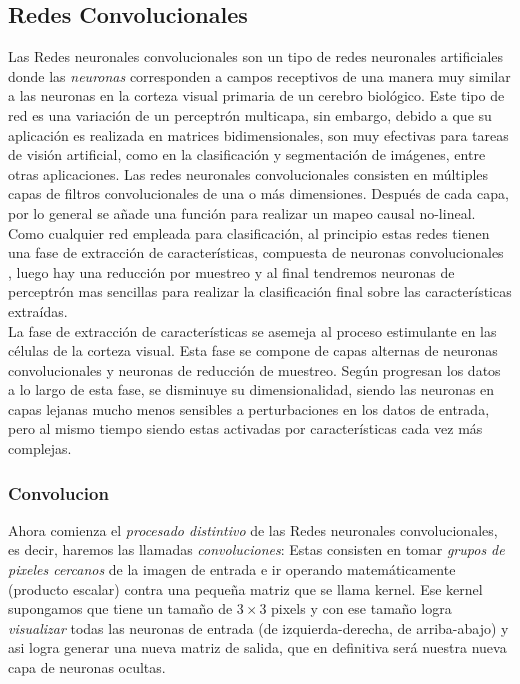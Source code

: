 \subsection{Redes Convolucionales}
\noindent
Las Redes neuronales convolucionales \cite{RedesConvolucionales} son  un tipo de redes neuronales artificiales  donde las \emph{neuronas}
corresponden a campos receptivos de una manera muy similar a las neuronas en la corteza visual primaria de un cerebro
biológico. Este tipo de red es una variación de un perceptrón multicapa, sin embargo, debido a que su aplicación es realizada
en matrices bidimensionales, son muy efectivas para tareas de visión artificial, como en la clasificación y segmentación 
de imágenes, entre otras aplicaciones.
Las redes neuronales convolucionales consisten en múltiples capas de filtros convolucionales de una o más dimensiones. Después de
cada capa, por lo general se añade una función para realizar un mapeo causal no-lineal.\\
Como cualquier  red empleada para clasificación, al principio estas redes tienen una  fase de extracción de características,
compuesta de neuronas convolucionales , luego hay una reducción por muestreo y al final tendremos neuronas de perceptrón mas
sencillas para realizar la clasificación final sobre las características extraídas.\\
La fase de extracción de características se asemeja al proceso estimulante en las células de la corteza visual. Esta fase se
compone de capas alternas de neuronas convolucionales y neuronas de reducción de muestreo. Según progresan los datos a lo largo
de esta fase, se disminuye su dimensionalidad, siendo las neuronas en capas lejanas mucho menos sensibles a perturbaciones en
los datos de entrada, pero al mismo tiempo siendo estas activadas por características cada vez más complejas.\\

\subsubsection{Convolucion}
Ahora comienza el \emph{procesado distintivo} de las Redes neuronales convolucionales, es decir, haremos las llamadas
\emph{convoluciones}: Estas consisten en tomar \emph{grupos de pixeles cercanos} de la imagen de entrada e ir operando
matemáticamente (producto escalar) contra una pequeña matriz que se llama kernel.  Ese kernel supongamos que tiene un tamaño
de $3\times 3$ pixels y con ese tamaño logra \emph{visualizar} todas las neuronas de entrada (de izquierda-derecha, de arriba-abajo)
y asi logra generar una nueva matriz de salida, que en definitiva será nuestra nueva capa de neuronas ocultas.\\

